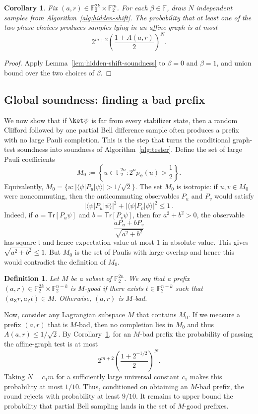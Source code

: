 \documentclass[11pt]{article}
\newtheorem{definition}[theorem]{Definition}
\newtheorem{corollary}[theorem]{Corollary}
\newcommand{\braketbra}[3]{\langle #1|#2| #3 \rangle}
\newcommand{\id}{\ensuremath{\mathbb{I}}}
\newcommand{\Z}{\mathsf{Z}}
\newcommand{\X}{\mathsf{X}}
\newcommand{\Tr}{\mathsf{Tr}}
\newcommand{\F}{\mathbb{F}}
\begin{document}
\begin{corollary}
\label{cor:two-phase-hidden-shift-soundness}
Fix $(a,r)\in\F_2^{2k}\times\F_2^m$.  For each $\beta\in\F$, draw $N$
independent samples from Algorithm~\ref{alg:hidden-shift}.  The probability
that at least one of the two phase choices produces samples lying in an affine
graph is at most
$$
    2^{m+2}\left(\frac{1+A(a,r)}2\right)^N.
$$
\end{corollary}

\begin{proof}
Apply Lemma~\ref{lem:hidden-shift-soundness} to $\beta=0$ and $\beta=1$, and
union bound over the two choices of $\beta$.
\end{proof}

\subsection{Global soundness: finding a bad prefix}
\label{subsec:global-soundness}

We now show that if $\ket\psi$ is far from every stabilizer state, then a random Clifford  followed by one partial
Bell difference sample often produces a prefix with no large Pauli completion.  This is
the step that turns the conditional graph-test soundness into soundness of
Algorithm~\ref{alg:tester}. Define the set of large Pauli coefficients
$$
    M_0:=\left\{u\in\F_2^{2n}:2^n p_\psi(u)>\frac12\right\}.
$$
Equivalently, $M_0=\{u:|\braketbra{\psi}{P_u}{\psi}|>1/\sqrt2\}$.  The set $M_0$ is
isotropic: if $u,v\in M_0$ were noncommuting, then the anticommuting
observables $P_u$ and $P_v$ would satisfy
$$
    |\braketbra{\psi}{P_u}{\psi}|^2+|\braketbra{\psi}{P_v}{\psi}|^2\le 1\ .
$$
Indeed, if $a = \Tr[P_u \psi]$ and $b=\Tr[P_v \psi]$, then for $a^2 + b^2 > 0$, the observable
$$
    \frac{aP_u + bP_v}{\sqrt{a^2+b^2}}
$$
has square $\id$ and hence expectation value at most $1$ in absolute value. This gives $\sqrt{a^2+b^2} \leq 1$. But $M_0$ is the set of Paulis with large overlap and hence this would contradict the definition of $M_0$. 

\begin{definition}\label{def:m_good}
    Let $M$ be a subset of  $\F_2^{2n}$. We say that a prefix $(a,r) \in \F_2^{2k}\times \F_2^{n-k}$ is $M$-good if there exists $t\in \F_2^{n-k}$ such that $(a_\X r, a_\Z t)\in M$. Otherwise, $(a,r)$ is $M$-bad.
\end{definition}

Now, consider any Lagrangian subspace $M$ that contains $M_0$. If we measure a prefix $(a,r)$ that is $M$-bad, then no completion lies in $M_0$ and thus $A(a,r) \leq 1/\sqrt{2}$. By
Corollary~\ref{cor:two-phase-hidden-shift-soundness}, for an $M$-bad prefix
the probability of passing the affine-graph test is at most
$$
    2^{m+2}\left(\frac{1+2^{-1/2}}2\right)^N.
$$
Taking $N=c_1m$ for a sufficiently large universal constant $c_1$ makes this
probability at most $1/10$.  Thus, conditioned on obtaining an $M$-bad prefix,
the round rejects with probability at least $9/10$. It remains to upper bound the probability that partial Bell sampling lands in
the set of $M$-good prefixes.
\end{document}

